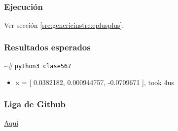 \documentclass{article}[12pt,a4paper]
\newcommand{\bashps}{\textasciitilde\#\,}
\begin{document}
\subsubsection{Ejecución}

Ver sección \ref{src:genericinstrc:cplusplus}.

\subsubsection{Resultados esperados}

\bashps\texttt{python3 clase567}

\begin{itemize}
  \item[] x = [ 0.0382182, 0.000944757, -0.0709671 ], took 4us
\end{itemize}

\subsubsection{Liga de \textbf{Github}}

\href{https://github.com/MarcosHCK/master-programming/tree/master/clase567}{Aquí \faGithubSquare}
\end{document}
